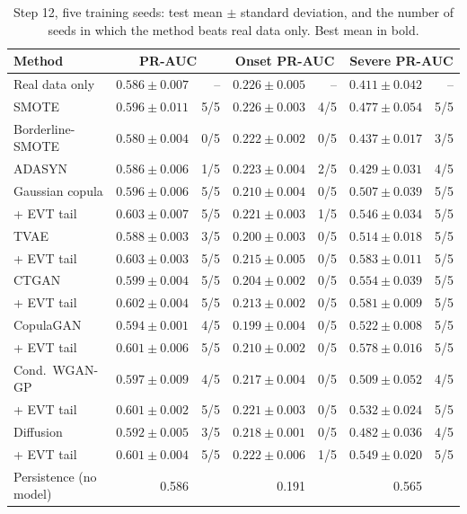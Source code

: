\documentclass[11pt,a4paper]{article}
\begin{document}
\begin{table}[H]
\centering\small
\caption{Step 12, five training seeds: test mean $\pm$ standard deviation, and the number of seeds in which
the method beats real data only. Best mean in bold.}\label{tab:step12}
\begin{tabular}{@{}lrrrrrr@{}}
\toprule
Method & \multicolumn{2}{c}{PR-AUC} & \multicolumn{2}{c}{Onset PR-AUC} & \multicolumn{2}{c}{Severe PR-AUC}\\
\midrule
Real data only & $0.586\pm0.007$ & -- & $0.226\pm0.005$ & -- & $0.411\pm0.042$ & --\\
SMOTE & $0.596\pm0.011$ & 5/5 & $\mathbf{0.226\pm0.003}$ & 4/5 & $0.477\pm0.054$ & 5/5\\
Borderline-SMOTE & $0.580\pm0.004$ & 0/5 & $0.222\pm0.002$ & 0/5 & $0.437\pm0.017$ & 3/5\\
ADASYN & $0.586\pm0.006$ & 1/5 & $0.223\pm0.004$ & 2/5 & $0.429\pm0.031$ & 4/5\\
\midrule
Gaussian copula & $0.596\pm0.006$ & 5/5 & $0.210\pm0.004$ & 0/5 & $0.507\pm0.039$ & 5/5\\
\quad + EVT tail & $\mathbf{0.603\pm0.007}$ & 5/5 & $0.221\pm0.003$ & 1/5 & $0.546\pm0.034$ & 5/5\\
TVAE & $0.588\pm0.003$ & 3/5 & $0.200\pm0.003$ & 0/5 & $0.514\pm0.018$ & 5/5\\
\quad + EVT tail & $0.603\pm0.003$ & 5/5 & $0.215\pm0.005$ & 0/5 & $\mathbf{0.583\pm0.011}$ & 5/5\\
CTGAN & $0.599\pm0.004$ & 5/5 & $0.204\pm0.002$ & 0/5 & $0.554\pm0.039$ & 5/5\\
\quad + EVT tail & $0.602\pm0.004$ & 5/5 & $0.213\pm0.002$ & 0/5 & $0.581\pm0.009$ & 5/5\\
CopulaGAN & $0.594\pm0.001$ & 4/5 & $0.199\pm0.004$ & 0/5 & $0.522\pm0.008$ & 5/5\\
\quad + EVT tail & $0.601\pm0.006$ & 5/5 & $0.210\pm0.002$ & 0/5 & $0.578\pm0.016$ & 5/5\\
Cond.\ WGAN-GP & $0.597\pm0.009$ & 4/5 & $0.217\pm0.004$ & 0/5 & $0.509\pm0.052$ & 4/5\\
\quad + EVT tail & $0.601\pm0.002$ & 5/5 & $0.221\pm0.003$ & 0/5 & $0.532\pm0.024$ & 5/5\\
Diffusion & $0.592\pm0.005$ & 3/5 & $0.218\pm0.001$ & 0/5 & $0.482\pm0.036$ & 4/5\\
\quad + EVT tail & $0.601\pm0.004$ & 5/5 & $0.222\pm0.006$ & 1/5 & $0.549\pm0.020$ & 5/5\\
\midrule
Persistence (no model) & 0.586 & & 0.191 & & 0.565 & \\
\bottomrule
\end{tabular}
\end{table}
\end{document}
